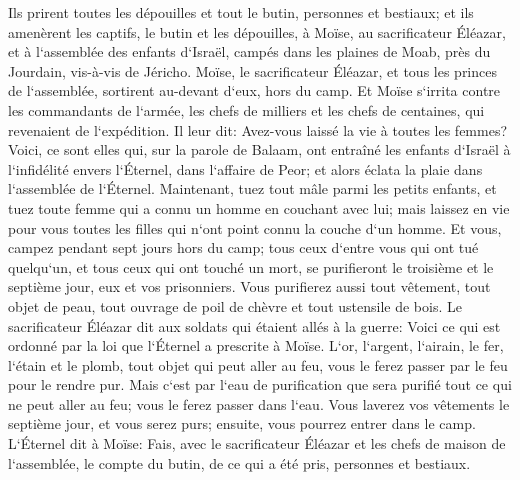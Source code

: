 \verse Ils prirent toutes les dépouilles et tout le butin, personnes et bestiaux; 
\verse et ils amenèrent les captifs, le butin et les dépouilles, à Moïse, au sacrificateur Éléazar, et à l`assemblée des enfants d`Israël, campés dans les plaines de Moab, près du Jourdain, vis-à-vis de Jéricho. 
\verse Moïse, le sacrificateur Éléazar, et tous les princes de l`assemblée, sortirent au-devant d`eux, hors du camp. 
\verse Et Moïse s`irrita contre les commandants de l`armée, les chefs de milliers et les chefs de centaines, qui revenaient de l`expédition. 
\verse Il leur dit: Avez-vous laissé la vie à toutes les femmes? 
\verse Voici, ce sont elles qui, sur la parole de Balaam, ont entraîné les enfants d`Israël à l`infidélité envers l`Éternel, dans l`affaire de Peor; et alors éclata la plaie dans l`assemblée de l`Éternel. 
\verse Maintenant, tuez tout mâle parmi les petits enfants, et tuez toute femme qui a connu un homme en couchant avec lui; 
\verse mais laissez en vie pour vous toutes les filles qui n`ont point connu la couche d`un homme. 
\verse Et vous, campez pendant sept jours hors du camp; tous ceux d`entre vous qui ont tué quelqu`un, et tous ceux qui ont touché un mort, se purifieront le troisième et le septième jour, eux et vos prisonniers. 
\verse Vous purifierez aussi tout vêtement, tout objet de peau, tout ouvrage de poil de chèvre et tout ustensile de bois. 
\verse Le sacrificateur Éléazar dit aux soldats qui étaient allés à la guerre: Voici ce qui est ordonné par la loi que l`Éternel a prescrite à Moïse. 
\verse L`or, l`argent, l`airain, le fer, l`étain et le plomb, 
\verse tout objet qui peut aller au feu, vous le ferez passer par le feu pour le rendre pur. Mais c`est par l`eau de purification que sera purifié tout ce qui ne peut aller au feu; vous le ferez passer dans l`eau. 
\verse Vous laverez vos vêtements le septième jour, et vous serez purs; ensuite, vous pourrez entrer dans le camp. 
\verse L`Éternel dit à Moïse: 
\verse Fais, avec le sacrificateur Éléazar et les chefs de maison de l`assemblée, le compte du butin, de ce qui a été pris, personnes et bestiaux. 
